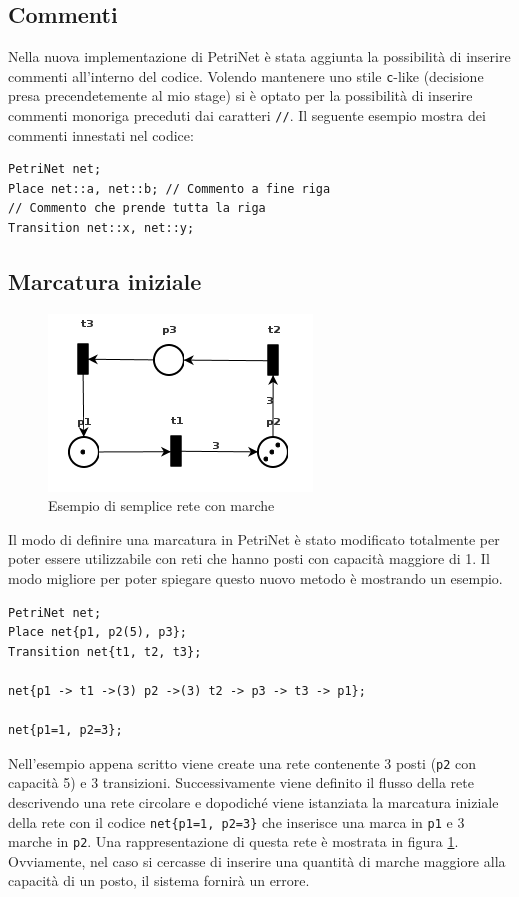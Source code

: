 \documentclass[italian,12pt]{book}
\begin{document}
\subsection{Commenti}\label{ssect:new_commenti}
Nella nuova implementazione di PetriNet è stata aggiunta la possibilità di inserire commenti all'interno del 
codice. Volendo mantenere uno stile {\tt c}-like (decisione presa precendetemente al mio stage) si è optato 
per la possibilità di inserire commenti monoriga preceduti dai caratteri {\tt //}. Il seguente esempio mostra 
dei commenti innestati nel codice:
\begin{verbatim}PetriNet net;
Place net::a, net::b; // Commento a fine riga
// Commento che prende tutta la riga
Transition net::x, net::y;
\end{verbatim}

\subsection{Marcatura iniziale}
\begin{figure}[htb]
\centerline{\includegraphics[width=7cm]{img/test_marcature.png}}
\caption{Esempio di semplice rete con marche}\label{fig:test_marcature.png}
\end{figure}
Il modo di definire una marcatura in PetriNet è stato modificato totalmente per poter essere utilizzabile con reti che hanno posti con capacità maggiore di 1.
Il modo migliore per poter spiegare questo nuovo metodo è mostrando un esempio.
\begin{verbatim}PetriNet net;
Place net{p1, p2(5), p3};
Transition net{t1, t2, t3};

net{p1 -> t1 ->(3) p2 ->(3) t2 -> p3 -> t3 -> p1};

net{p1=1, p2=3};
\end{verbatim}

Nell'esempio appena scritto viene create una rete contenente 3 posti ({\tt p2} con capacità 5) e 3 transizioni. 
Successivamente viene definito il flusso della rete descrivendo una rete circolare e dopodiché viene istanziata la marcatura iniziale della rete con il codice {\tt net\{p1=1, p2=3\}}
 che inserisce una marca in {\tt p1} e 3 marche in {\tt p2}. Una rappresentazione di questa rete è mostrata in figura \ref{fig:test_marcature.png}.\\
Ovviamente, nel caso si cercasse di inserire una quantità di marche maggiore alla capacità di un posto, il sistema fornirà un errore.
\end{document}
